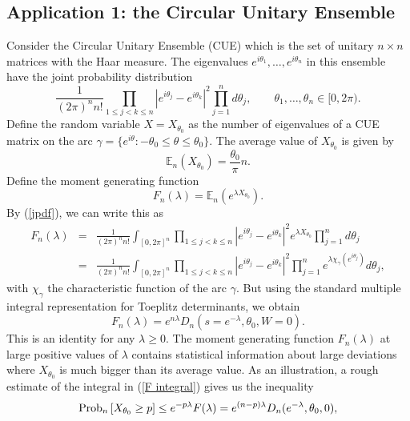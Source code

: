 \documentclass[11pt,fleqn]{article}
\numberwithin{equation}{section}
\begin{document}
\subsection*{Application 1: the Circular Unitary Ensemble}
Consider the Circular Unitary Ensemble (CUE) which is the set of unitary $n\times n$ matrices with the Haar measure.
The eigenvalues $e^{i\theta_1},\ldots, e^{i\theta_n}$ in this ensemble have the joint probability distribution
\begin{equation}\label{jpdf}
\frac{1}{(2\pi)^n n!}\prod_{1\leq j<k\leq n}|e^{i\theta_j}-e^{i\theta_k}|^2 \prod_{j=1}^nd\theta_j,\qquad \theta_1,\ldots, \theta_n\in [0,2\pi).
\end{equation}
Define the random variable $X=X_{\theta_0}$ as the number of eigenvalues of a CUE matrix on the arc $\gamma=\{e^{i\theta}:-\theta_0\leq \theta\leq \theta_0\}$. The average value of $X_{\theta_0}$ is given by
\begin{equation}
\mathbb E_n(X_{\theta_0})=\frac{\theta_0}{\pi}n.
\end{equation}
Define the moment generating function
\begin{equation}
F_n(\lambda)=\mathbb E_n(e^{\lambda X_{\theta_0}}).
\end{equation}
By (\ref{jpdf}), we can write this as
\begin{eqnarray}
F_n(\lambda)&=&\frac{1}{(2\pi)^n n!}\int_{[0,2\pi]^n}\prod_{1\leq j<k\leq n}|e^{i\theta_j}-e^{i\theta_k}|^2 e^{\lambda X_{\theta_0}}\prod_{j=1}^nd\theta_j\\
&=&
\frac{1}{(2\pi)^n n!}\int_{[0,2\pi]^n}\prod_{1\leq j<k\leq n}|e^{i\theta_j}-e^{i\theta_k}|^2 \prod_{j=1}^ne^{\lambda\chi_\gamma(e^{i\theta_j})}d\theta_j,\label{F integral}
\end{eqnarray}
with $\chi_\gamma$ the characteristic function of the arc $\gamma$.
But using the standard multiple integral representation for Toeplitz determinants, we obtain
\begin{equation}
F_n(\lambda)=e^{n\lambda}D_n(s=e^{-\lambda},\theta_0, W=0).
\end{equation}
This is an identity for any $\lambda\geq 0$.
The moment generating function $F_n(\lambda)$ at large positive values of $\lambda$ contains statistical information about large deviations where $X_{\theta_0}$ is much bigger than its average value. As an illustration, a rough estimate of the integral in (\ref{F integral}) gives us the inequality
\begin{equation}\label{est1}
{\rm Prob}_n\left[X_{\theta_0}\geq p\right]\leq e^{-p\lambda}F(\lambda)=e^{(n-p)\lambda}D_n(e^{-\lambda},\theta_0, 0),
\end{equation}
\end{document}
